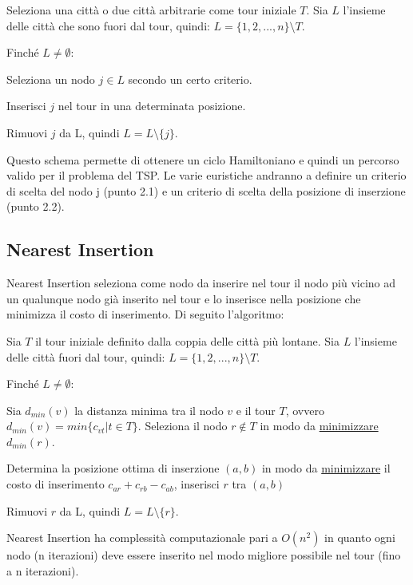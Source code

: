 \documentclass[a4paper,12pt]{report}
\begin{document}
\begin{tcolorbox}[colframe=black,colback=white,boxrule=0.5pt, sharp corners, breakable]
\begin{legal}
  \item Seleziona una città o due città arbitrarie come tour iniziale $T$. Sia $L$ l'insieme delle città che sono fuori dal tour, quindi: $L = \{1, 2, ..., n\} \setminus T$.
  \item Finché $L \neq \emptyset$:
  \begin{legal}
    \item Seleziona un nodo $j \in L$ secondo un certo criterio.
    \item Inserisci $j$ nel tour in una determinata posizione.
    \item Rimuovi $j$ da L, quindi $L = L \setminus \{j\}$.
  \end{legal}
\end{legal}
\end{tcolorbox}
\hfill \break
Questo schema permette di ottenere un ciclo Hamiltoniano e quindi un percorso valido per il problema del TSP. Le varie euristiche andranno a definire un criterio di scelta del nodo j (punto 2.1) e un criterio di scelta della posizione di inserzione (punto 2.2).

\subsection{Nearest Insertion} \label{ssec:NI}
Nearest Insertion seleziona come nodo da inserire nel tour il nodo più vicino ad un qualunque nodo già inserito nel tour e lo inserisce nella posizione che minimizza il costo di inserimento. Di seguito l'algoritmo:

\begin{tcolorbox}[colframe=black,colback=white,boxrule=0.5pt, sharp corners, breakable]
  \begin{legal}
    \item Sia $T$ il tour iniziale definito dalla coppia delle città più lontane. Sia $L$ l'insieme delle città fuori dal tour, quindi: $L = \{1, 2, ..., n\} \setminus T$.
    \item Finché $L \neq \emptyset$:
    \begin{legal}
      \item Sia $d_{min}(v)$ la distanza minima tra il nodo $v$ e il tour $T$, ovvero $d_{min}(v) = min\{c_{vt} | t \in T \}$. Seleziona il nodo $r \not \in T$ in modo da \underline{minimizzare} $d_{min}(r)$.
      \item Determina la posizione ottima di inserzione $(a, b)$ in modo da \underline{minimizzare} il costo di inserimento $c_{ar} + c_{rb} - c_{ab}$, inserisci $r$ tra $(a, b)$
      \item Rimuovi $r$ da L, quindi $L = L \setminus \{r\}$.
    \end{legal}
  \end{legal}
  \end{tcolorbox}
\hfill \break Nearest Insertion ha complessità computazionale pari a $O(n^2)$ in quanto ogni nodo (n iterazioni) deve essere inserito nel modo migliore possibile nel tour (fino a n iterazioni).
\end{document}
